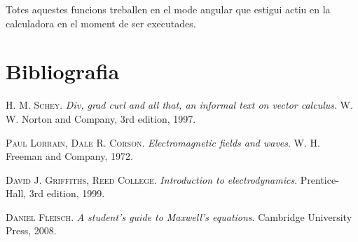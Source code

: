 \documentclass[catalan,a4paper,twoside,11pt]{article}
\begin{document}
Totes aquestes funcions treballen en el mode angular que estigui actiu en la calculadora en el moment de ser executades.



\section{Bibliografia}

\textsc{H. M. Schey}. \textsl{Div, grad curl and all that, an informal text on vector calculus}.  W. W. Norton and Company, 3rd edition, 1997.

\textsc{Paul Lorrain, Dale R. Corson}. \textsl{Electromagnetic fields and waves}.  W. H. Freeman and Company, 1972.

\textsc{David J. Griffiths, Reed College}. \textsl{Introduction to electrodynamics}. Prentice-Hall, 3rd edition, 1999.

\textsc{Daniel Fleisch}. \textsl{A student's guide to Maxwell's equations}. Cambridge University Press, 2008.
\end{document}

